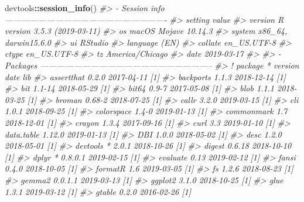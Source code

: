 \documentclass[oneside]{book}\usepackage[]{graphicx}\usepackage[]{color}
\newenvironment{Shaded}{\begin{snugshade}}{\end{snugshade}}
\newcommand{\CommentTok}[1]{\textcolor[rgb]{0.56,0.35,0.01}{\textit{#1}}}
\newcommand{\KeywordTok}[1]{\textcolor[rgb]{0.13,0.29,0.53}{\textbf{#1}}}
\newcommand{\NormalTok}[1]{#1}
\newcommand{\OperatorTok}[1]{\textcolor[rgb]{0.81,0.36,0.00}{\textbf{#1}}}
\begin{document}
\begin{Shaded}
\begin{Highlighting}[]
\NormalTok{devtools}\OperatorTok{::}\KeywordTok{session_info}\NormalTok{()}
\CommentTok{#> - Session info ----------------------------------------------------------}
\CommentTok{#>  setting  value                       }
\CommentTok{#>  version  R version 3.5.3 (2019-03-11)}
\CommentTok{#>  os       macOS Mojave 10.14.3        }
\CommentTok{#>  system   x86_64, darwin15.6.0        }
\CommentTok{#>  ui       RStudio                     }
\CommentTok{#>  language (EN)                        }
\CommentTok{#>  collate  en_US.UTF-8                 }
\CommentTok{#>  ctype    en_US.UTF-8                 }
\CommentTok{#>  tz       America/Chicago             }
\CommentTok{#>  date     2019-03-17                  }
\CommentTok{#> }
\CommentTok{#> - Packages --------------------------------------------------------------}
\CommentTok{#>  ! package        * version    date       lib}
\CommentTok{#>    assertthat       0.2.0      2017-04-11 [1]}
\CommentTok{#>    backports        1.1.3      2018-12-14 [1]}
\CommentTok{#>    bit              1.1-14     2018-05-29 [1]}
\CommentTok{#>    bit64            0.9-7      2017-05-08 [1]}
\CommentTok{#>    blob             1.1.1      2018-03-25 [1]}
\CommentTok{#>    broman           0.68-2     2018-07-25 [1]}
\CommentTok{#>    callr            3.2.0      2019-03-15 [1]}
\CommentTok{#>    cli              1.0.1      2018-09-25 [1]}
\CommentTok{#>    colorspace       1.4-0      2019-01-13 [1]}
\CommentTok{#>    commonmark       1.7        2018-12-01 [1]}
\CommentTok{#>    crayon           1.3.4      2017-09-16 [1]}
\CommentTok{#>    curl             3.3        2019-01-10 [1]}
\CommentTok{#>    data.table       1.12.0     2019-01-13 [1]}
\CommentTok{#>    DBI              1.0.0      2018-05-02 [1]}
\CommentTok{#>    desc             1.2.0      2018-05-01 [1]}
\CommentTok{#>    devtools       * 2.0.1      2018-10-26 [1]}
\CommentTok{#>    digest           0.6.18     2018-10-10 [1]}
\CommentTok{#>    dplyr          * 0.8.0.1    2019-02-15 [1]}
\CommentTok{#>    evaluate         0.13       2019-02-12 [1]}
\CommentTok{#>    fansi            0.4.0      2018-10-05 [1]}
\CommentTok{#>    formatR          1.6        2019-03-05 [1]}
\CommentTok{#>    fs               1.2.6      2018-08-23 [1]}
\CommentTok{#>    gemma2           0.0.1.1    2019-03-13 [1]}
\CommentTok{#>    ggplot2          3.1.0      2018-10-25 [1]}
\CommentTok{#>    glue             1.3.1      2019-03-12 [1]}
\CommentTok{#>    gtable           0.2.0      2016-02-26 [1]}

\end{Highlighting}
\end{Shaded}
\end{document}
